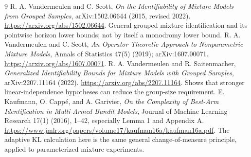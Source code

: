 \documentclass[11pt]{article}
\theoremstyle{remark}\newtheorem{remark}[theorem]{Remark}
\begin{document}
\begin{thebibliography}{9}
R. A. Vandermeulen and C. Scott,
\emph{On the Identifiability of Mixture Models from Grouped Samples},
arXiv:1502.06644 (2015, revised 2022).
\url{https://arxiv.org/abs/1502.06644}.
General grouped-mixture identification and its pointwise horizon lower bounds; not by itself a monodromy lower bound.
R. A. Vandermeulen and C. Scott,
\emph{An Operator Theoretic Approach to Nonparametric Mixture Models},
Annals of Statistics 47(5) (2019); arXiv:1607.00071.
\url{https://arxiv.org/abs/1607.00071}.
R. A. Vandermeulen and R. Saitenmacher,
\emph{Generalized Identifiability Bounds for Mixture Models with Grouped Samples},
arXiv:2207.11164 (2022).
\url{https://arxiv.org/abs/2207.11164}.
Shows that stronger linear-independence hypotheses can reduce the group-size requirement.
E. Kaufmann, O. Capp\'e, and A. Garivier,
\emph{On the Complexity of Best-Arm Identification in Multi-Armed Bandit Models},
Journal of Machine Learning Research 17(1) (2016), 1--42, especially Lemma 1 and Appendix A.
\url{https://www.jmlr.org/papers/volume17/kaufman16a/kaufman16a.pdf}.
The adaptive KL calculation here is the same general change-of-measure principle, applied to parameterized mixture experiments.
\end{thebibliography}
\end{document}
